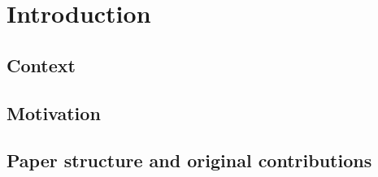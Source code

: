 \chapter{Introduction}
\label{chapter:introduction}

\section{Context}
\label{section:context} 

\section{Motivation}
\label{section:motivation} 


\section{Paper structure and original contributions}
\label{section:structure}

